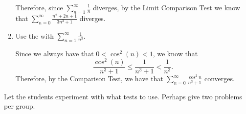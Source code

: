 \documentclass[noinstructornotes]{ximera}
\begin{document}
\begin{problem}
\begin{freeResponse}
\begin{enumerate}
		Therefore, since $\sum_{n=1}^\infty \frac{1}{n}$ diverges, by the Limit Comparison Test we know that $\sum_{n=0}^\infty \frac{n^2+2n+1}{3n^3+1}$ diverges.
		
		\item  Use the  with $\sum_{n=1}^\infty \frac{1}{n^3}$.  
		
		Since we always have that $0 < \cos^2(n) < 1$, we know that
			\[
			\frac{\cos^2(n)}{n^3 + 1} \leq \frac{1}{n^3+1} < \frac{1}{n^3}.
			\]
		Therefore, by the Comparison Test, we have that $\sum_{n=0}^\infty \frac{\cos^2 n}{n^3+1}$ converges.
		
	
		
		
		\end{enumerate}
	\end{freeResponse}
	
\end{problem}

\begin{instructorNotes}
Let the students experiment with what tests to use.  
Perhaps give two problems per group.
\end{instructorNotes}










	
	
	
	
	
	
	
	
	

	










								
				
				
	
\end{document}
